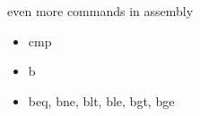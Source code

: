 


\begin{frame}{even more commands in assembly}

    \begin{itemize}
        \item cmp 
        \item b
        \item beq, bne, blt, ble, bgt, bge
    \end{itemize}
    
    \end{frame}

